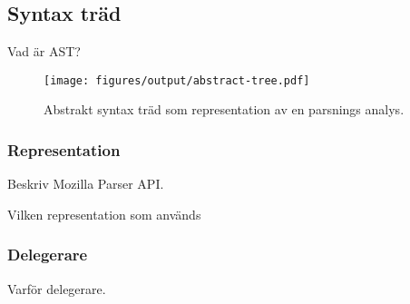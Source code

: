 \subsection{Syntax träd}

Vad är AST?

\begin{figure}[ht]
  \texttt{[image: figures/output/abstract-tree.pdf]}
  \caption{Abstrakt syntax träd som representation av en parsnings analys.}
\end{figure}

\subsubsection{Representation}

Beskriv Mozilla Parser API.

Vilken representation som används

\subsubsection{Delegerare}

Varför delegerare.

%
%
%
%

